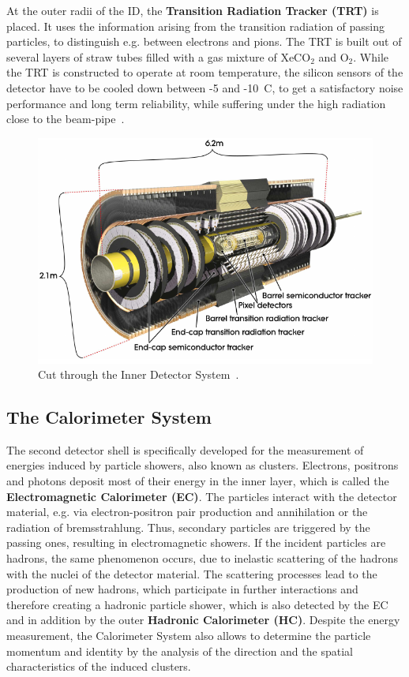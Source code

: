  At the outer radii of the ID, the \textbf{Transition Radiation Tracker (TRT)} is placed.
It uses the information arising from the transition radiation of passing particles, to distinguish e.g. between electrons and pions. The TRT is built out of several layers of straw tubes filled with a gas mixture of XeCO$_2$ and O$_2$. While the TRT is constructed to operate at room temperature, the silicon sensors of the detector have to be cooled down between -5 and -10~\textdegree C, to get a satisfactory noise performance and long term reliability, while suffering under the high radiation close to the beam-pipe~\cite{Aad:2008zzm}.     
\begin{figure}[t]
	\centering
	\includegraphics[width=0.7\linewidth]{Pics/cp3/34}
	\caption{Cut through the Inner Detector System~\cite{Aad:2008zzm}.} 
	\label{fig:34}
\end{figure}

\subsection{The Calorimeter System}\label{CD}




The second detector shell is specifically developed for the measurement of energies induced by particle showers, also known as clusters. 
Electrons, positrons and photons deposit most of their energy in the inner layer, which is called the \textbf{Electromagnetic Calorimeter (EC)}.  The particles interact with the  detector material, e.g. via electron-positron pair production and annihilation or the radiation of bremsstrahlung. Thus, secondary particles are triggered by the passing ones, resulting in electromagnetic showers. If the incident particles are hadrons, the same phenomenon occurs, due to inelastic scattering  of the hadrons with the nuclei of the detector material. The scattering processes lead to the production of new hadrons, which participate in further interactions and therefore creating a hadronic particle shower, which is also detected by the EC and in addition by the outer \textbf{Hadronic Calorimeter (HC)}. Despite the energy measurement, the Calorimeter System also allows to determine the particle momentum and identity by the analysis of the direction and the spatial characteristics of the induced clusters.

